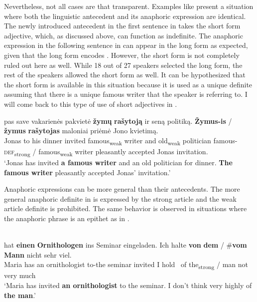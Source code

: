 \documentclass[output=paper,
modfonts
]{langscibook}
\begin{document}
Nevertheless, not all cases are that transparent. Examples like  present a situation where both the linguistic antecedent and its anaphoric expression are identical. The newly introduced antecedent in the first sentence in  takes the short form adjective, which, as discussed above, can function as indefinite. The anaphoric expression in the following sentence in  can appear in the long form as expected, given that the long form encodes . However, the short form is not completely ruled out here as well. While 18 out of 27 speakers selected the long form, the rest of the speakers allowed the short form as well. It can be hypothesized that the short form is available in this situation because it is used as a unique definite assuming that there is a unique famous writer that the speaker is referring to. I will come back to this type of use of short adjectives in .

\begin{exe}
	\ex \label{ex:sereikaite:38}
	 {pas} {save} {vakarienės} {pakvietė} \textbf{žymų} \textbf{rašytoją} {ir} {seną} {politiką}. \textbf{Žymus-is} \textnormal{/} \textbf{žymus} {\textbf{rašytojas}} {maloniai} {priėmė} {Jono} {kvietimą}. \\
	Jonas to his dinner invited {famous\textsubscript{weak}} {writer} and old\textsubscript{weak} politician {famous-\textsc{def}\textsubscript{strong}} / {famous\textsubscript{weak}} {writer} pleasantly accepted Jonas invitation.\\
	\trans `Jonas has invited \textbf{a famous writer} and an old politician for dinner. \textbf{The famous writer} pleasantly accepted Jonas' invitation.' 
\end{exe}

Anaphoric expressions can be more general than their antecedents. The more general anaphoric definite in  is expressed by the strong article  and the weak article definite is prohibited. The same behavior is observed in situations where the anaphoric phrase is an epithet as in .


\begin{exe}
	\ex \label{ex:sereikaite:39}
	 \citep[31]{Schwarz2009} \\
	 {hat} {\textbf{einen}} {\textbf{Ornithologen}} {ins} {Seminar} {eingeladen}. {Ich} {halte} \textbf{von} \textbf{dem} \textnormal{/} \textnormal{\#}\textbf{vom} {\textbf{Mann}} {nicht} {sehr} {viel}. \\
	Maria has {an} {ornithologist} to-the seminar invited I hold \ {of} {the\textsubscript{strong}} /  {man} not very much\\
	\trans `Maria has invited \textbf{an ornithologist} to the seminar. I don't think very highly of \textbf{the man}.' 
\end{exe}
\end{document}
